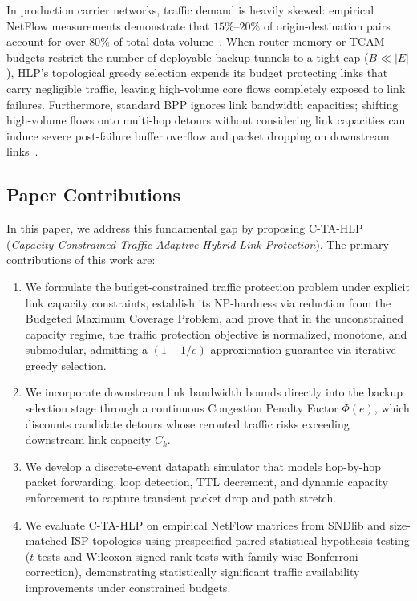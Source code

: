 \documentclass[journal]{IEEEtran}
\begin{document}
In production carrier networks, traffic demand is heavily skewed: empirical NetFlow measurements demonstrate that $15\%\text{--}20\%$ of origin-destination pairs account for over $80\%$ of total data volume~\cite{feldmann2001deriving,schlinker2017engineering}. When router memory or TCAM budgets restrict the number of deployable backup tunnels to a tight cap ($B \ll |E|$), HLP's topological greedy selection expends its budget protecting links that carry negligible traffic, leaving high-volume core flows completely exposed to link failures. Furthermore, standard BPP ignores link bandwidth capacities; shifting high-volume flows onto multi-hop detours without considering link capacities can induce severe post-failure buffer overflow and packet dropping on downstream links~\cite{foerster2019casa}.

\subsection{Paper Contributions}
In this paper, we address this fundamental gap by proposing C-TA-HLP (\textit{Capacity-Constrained Traffic-Adaptive Hybrid Link Protection}). The primary contributions of this work are:
\begin{enumerate}
    \item We formulate the budget-constrained traffic protection problem under explicit link capacity constraints, establish its NP-hardness via reduction from the Budgeted Maximum Coverage Problem, and prove that in the unconstrained capacity regime, the traffic protection objective is normalized, monotone, and submodular, admitting a $(1 - 1/e)$ approximation guarantee via iterative greedy selection.
    \item We incorporate downstream link bandwidth bounds directly into the backup selection stage through a continuous Congestion Penalty Factor $\Phi(e)$, which discounts candidate detours whose rerouted traffic risks exceeding downstream link capacity $C_k$.
    \item We develop a discrete-event datapath simulator that models hop-by-hop packet forwarding, loop detection, TTL decrement, and dynamic capacity enforcement to capture transient packet drop and path stretch.
    \item We evaluate C-TA-HLP on empirical NetFlow matrices from SNDlib and size-matched ISP topologies using prespecified paired statistical hypothesis testing ($t$-tests and Wilcoxon signed-rank tests with family-wise Bonferroni correction), demonstrating statistically significant traffic availability improvements under constrained budgets.
\end{enumerate}
\end{document}
